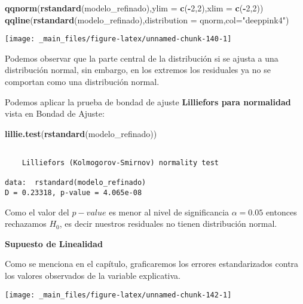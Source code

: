 \documentclass[
  a4paper,
  oneside,
  openany]{book}
\newenvironment{Shaded}{\begin{snugshade}}{\end{snugshade}}
\newcommand{\AttributeTok}[1]{\textcolor[rgb]{0.13,0.29,0.53}{#1}}
\newcommand{\DecValTok}[1]{\textcolor[rgb]{0.00,0.00,0.81}{#1}}
\newcommand{\FunctionTok}[1]{\textcolor[rgb]{0.13,0.29,0.53}{\textbf{#1}}}
\newcommand{\NormalTok}[1]{#1}
\newcommand{\SpecialCharTok}[1]{\textcolor[rgb]{0.81,0.36,0.00}{\textbf{#1}}}
\newcommand{\StringTok}[1]{\textcolor[rgb]{0.31,0.60,0.02}{#1}}
\begin{document}
\begin{Shaded}
\begin{Highlighting}[]
\FunctionTok{qqnorm}\NormalTok{(}\FunctionTok{rstandard}\NormalTok{(modelo\_refinado),}\AttributeTok{ylim =} \FunctionTok{c}\NormalTok{(}\SpecialCharTok{{-}}\DecValTok{2}\NormalTok{,}\DecValTok{2}\NormalTok{),}\AttributeTok{xlim =} \FunctionTok{c}\NormalTok{(}\SpecialCharTok{{-}}\DecValTok{2}\NormalTok{,}\DecValTok{2}\NormalTok{))}
\FunctionTok{qqline}\NormalTok{(}\FunctionTok{rstandard}\NormalTok{(modelo\_refinado),}\AttributeTok{distribution =}\NormalTok{ qnorm,}\AttributeTok{col=}\StringTok{"deeppink4"}\NormalTok{)}
\end{Highlighting}
\end{Shaded}

\begin{center}\texttt{[image: \_main\_files/figure-latex/unnamed-chunk-140-1]} \end{center}

Podemos observar que la parte central de la distribución si se ajusta a una distribución normal, sin embargo, en los extremos los residuales ya no se comportan como una distribución normal.

Podemos aplicar la prueba de bondad de ajuste \textbf{Lilliefors para normalidad} vista en Bondad de Ajuste:

\begin{Shaded}
\begin{Highlighting}[]
\FunctionTok{lillie.test}\NormalTok{(}\FunctionTok{rstandard}\NormalTok{(modelo\_refinado))}
\end{Highlighting}
\end{Shaded}

\begin{verbatim}

    Lilliefors (Kolmogorov-Smirnov) normality test

data:  rstandard(modelo_refinado)
D = 0.23318, p-value = 4.065e-08
\end{verbatim}

Como el valor del \(p-value\) es menor al nivel de significancia \(\alpha=0.05\) entonces rechazamos \(H_{0}\), es decir nuestros residuales no tienen distribución normal.

\textbf{Supuesto de Linealidad}

Como se menciona en el capítulo, graficaremos los errores estandarizados contra los valores observados de la variable explicativa.

\begin{center}\texttt{[image: \_main\_files/figure-latex/unnamed-chunk-142-1]} \end{center}
\end{document}
